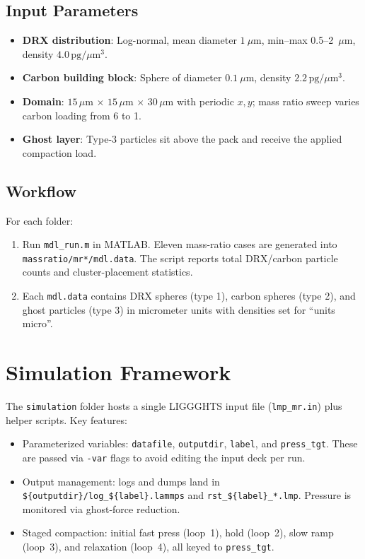 \documentclass[11pt]{article}
\begin{document}
\subsection{Input Parameters}
\begin{itemize}
    \item \textbf{DRX distribution}: Log-normal, mean diameter $1~\mu$m, min--max 0.5--2~$\mu$m, density $4.0\,\text{pg}/\mu\text{m}^3$.
    \item \textbf{Carbon building block}: Sphere of diameter $0.1~\mu$m, density $2.2\,\text{pg}/\mu\text{m}^3$.
    \item \textbf{Domain}: $15\,\mu$m $\times$ $15\,\mu$m $\times$ $30\,\mu$m with periodic $x,y$; mass ratio sweep varies carbon loading from 6 to 1.
    \item \textbf{Ghost layer}: Type-3 particles sit above the pack and receive the applied compaction load.
\end{itemize}

\subsection{Workflow}
For each folder:
\begin{enumerate}
    \item Run \texttt{mdl\_run.m} in MATLAB. Eleven mass-ratio cases are generated into \texttt{massratio/mr*/mdl.data}. The script reports total DRX/carbon particle counts and cluster-placement statistics.
    \item Each \texttt{mdl.data} contains DRX spheres (type 1), carbon spheres (type 2), and ghost particles (type 3) in micrometer units with densities set for ``units micro''.
\end{enumerate}

\section{Simulation Framework}
The \texttt{simulation} folder hosts a single LIGGGHTS input file (\texttt{lmp\_mr.in}) plus helper scripts. Key features:
\begin{itemize}
    \item Parameterized variables: \texttt{datafile}, \texttt{outputdir}, \texttt{label}, and \texttt{press\_tgt}. These are passed via \texttt{-var} flags to avoid editing the input deck per run.
    \item Output management: logs and dumps land in \texttt{\$\{outputdir\}/log\_\$\{label\}.lammps} and \texttt{rst\_\$\{label\}\_*.lmp}. Pressure is monitored via ghost-force reduction.
    \item Staged compaction: initial fast press (loop~1), hold (loop~2), slow ramp (loop~3), and relaxation (loop~4), all keyed to \texttt{press\_tgt}.
\end{itemize}
\end{document}
